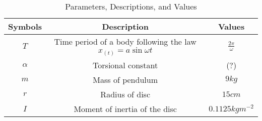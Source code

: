 \begin{table}[ht!]
\centering
\begin{tabular}{ |c|c|c| } 
 \hline
Symbols & Description & Values  \\
\hline
 $T$ & Time period of a body following the law $x_{(t)} = a\sin{\omega t}$ &$\frac{2\pi}{\omega}$\\
 \hline
 $\alpha$ & Torsional constant & (?)\\
 \hline
 $m$ & Mass of pendulum & $9kg$\\
 \hline
 $r$& Radius of disc & $15cm$\\
 \hline
 $I$ & Moment of inertia of the disc & $0.1125kgm^{-2}$\\
\hline
\end{tabular}
\caption{Parameters, Descriptions, and Values}
\label{table:ee25-tab3}
\end{table}



